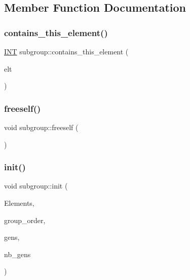 \subsection{Member Function Documentation}
\mbox{\label{classsubgroup_a10e5ed8ed6d22d291a05ccb800333b88}} 
\subsubsection{\texorpdfstring{contains\+\_\+this\+\_\+element()}{contains\_this\_element()}}
{\footnotesize\ttfamily \mbox{\hyperlink{galois_8h_a09fddde158a3a20bd2dcadb609de11dc}{I\+NT}} subgroup\+::contains\+\_\+this\+\_\+element (\begin{DoxyParamCaption}\item[{\mbox{\hyperlink{galois_8h_a09fddde158a3a20bd2dcadb609de11dc}{I\+NT}}}]{elt }\end{DoxyParamCaption})}

\mbox{\label{classsubgroup_a5e5396760b656084451289909587e28f}} 
\subsubsection{\texorpdfstring{freeself()}{freeself()}}
{\footnotesize\ttfamily void subgroup\+::freeself (\begin{DoxyParamCaption}{ }\end{DoxyParamCaption})}

\mbox{\label{classsubgroup_a2e5ada6e3fcdcbb7ee77cf66f92694a0}} 
\subsubsection{\texorpdfstring{init()}{init()}}
{\footnotesize\ttfamily void subgroup\+::init (\begin{DoxyParamCaption}\item[{\mbox{\hyperlink{galois_8h_a09fddde158a3a20bd2dcadb609de11dc}{I\+NT}} $\ast$}]{Elements,  }\item[{\mbox{\hyperlink{galois_8h_a09fddde158a3a20bd2dcadb609de11dc}{I\+NT}}}]{group\+\_\+order,  }\item[{\mbox{\hyperlink{galois_8h_a09fddde158a3a20bd2dcadb609de11dc}{I\+NT}} $\ast$}]{gens,  }\item[{\mbox{\hyperlink{galois_8h_a09fddde158a3a20bd2dcadb609de11dc}{I\+NT}}}]{nb\+\_\+gens }\end{DoxyParamCaption})}

